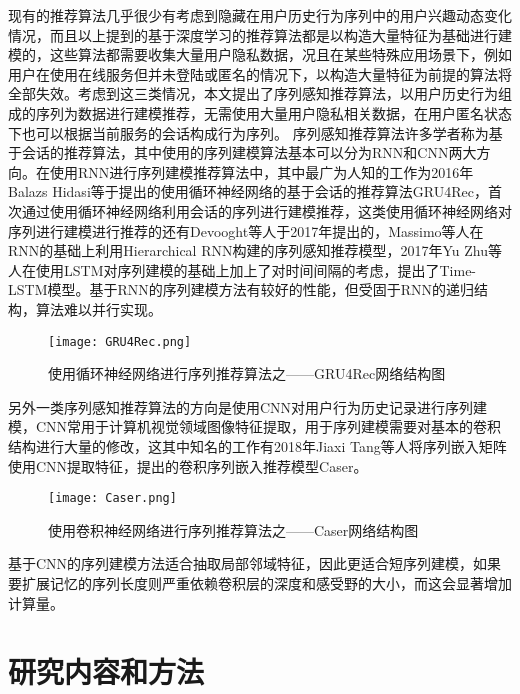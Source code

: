 现有的推荐算法几乎很少有考虑到隐藏在用户历史行为序列中的用户兴趣动态变化情况，而且以上提到的基于深度学习的推荐算法都是以构造大量特征为基础进行建模的，这些算法都需要收集大量用户隐私数据，况且在某些特殊应用场景下，例如用户在使用在线服务但并未登陆或匿名的情况下，以构造大量特征为前提的算法将全部失效。考虑到这三类情况，本文提出了序列感知推荐算法，以用户历史行为组成的序列为数据进行建模推荐，无需使用大量用户隐私相关数据，在用户匿名状态下也可以根据当前服务的会话构成行为序列。
序列感知推荐算法许多学者称为基于会话的推荐算法，其中使用的序列建模算法基本可以分为RNN和CNN两大方向。在使用RNN进行序列建模推荐算法中，其中最广为人知的工作为2016年Balazs Hidasi等于提出的使用循环神经网络的基于会话的推荐算法GRU4Rec，首次通过使用循环神经网络利用会话的序列进行建模推荐，这类使用循环神经网络对序列进行建模进行推荐的还有Devooght等人于2017年提出的，Massimo等人在RNN的基础上利用Hierarchical RNN构建的序列感知推荐模型，2017年Yu Zhu等人在使用LSTM对序列建模的基础上加上了对时间间隔的考虑，提出了Time-LSTM模型。基于RNN的序列建模方法有较好的性能，但受固于RNN的递归结构，算法难以并行实现。
\begin{figure}[htb]
  \centering
  \texttt{[image: GRU4Rec.png]}\\
  \caption{使用循环神经网络进行序列推荐算法之——GRU4Rec网络结构图}
  \label{fig:GRU4Rec}
\end{figure}

另外一类序列感知推荐算法的方向是使用CNN对用户行为历史记录进行序列建模，CNN常用于计算机视觉领域图像特征提取，用于序列建模需要对基本的卷积结构进行大量的修改，这其中知名的工作有2018年Jiaxi Tang等人将序列嵌入矩阵使用CNN提取特征，提出的卷积序列嵌入推荐模型Caser。
\begin{figure}[htb]
  \centering
  \texttt{[image: Caser.png]}\\
  \caption{使用卷积神经网络进行序列推荐算法之——Caser网络结构图}
  \label{fig:Caser}
\end{figure}

基于CNN的序列建模方法适合抽取局部邻域特征，因此更适合短序列建模，如果要扩展记忆的序列长度则严重依赖卷积层的深度和感受野的大小，而这会显著增加计算量。

\section{研究内容和方法}
